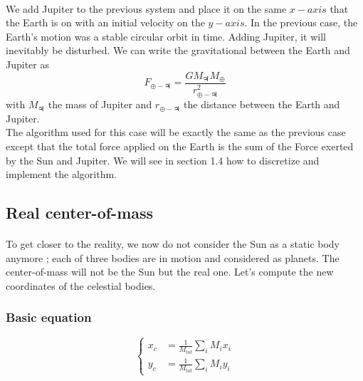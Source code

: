 \documentclass[a4paper, twoside, 11pt]{report}
\theoremstyle{theorem}
\theoremstyle{remark}
\theoremstyle{exemple}
\begin{document}
            \paragraph{}We add Jupiter to the previous system and place it on the same $x-axis$ that the Earth is on  with an initial velocity on the $y-axis$. In the previous case, the Earth's motion was a stable circular orbit in time. Adding Jupiter, it will inevitably be disturbed. We can write the gravitational between the Earth and Jupiter as 
                \begin{equation*}
                    F_{\oplus-\jupiter} = \frac{GM_{\jupiter}M_{\oplus}}{r_{\oplus-\jupiter}^2} 
                \end{equation*}
            with $M_{\jupiter}$ the mass of Jupiter and $r_{\oplus - \jupiter}$ the distance between the Earth and Jupiter. \\
            The algorithm used for this case will be exactly the same as the previous case except that the total force applied on the Earth is the sum of the Force exerted by the Sun and Jupiter. We will see in section 1.4 how to discretize and implement the algorithm. 
            
        \subsection{Real center-of-mass}
        
            \paragraph{}To get closer to the reality, we now do not consider the Sun as a static body anymore ; each of three bodies are in motion and considered as planets. The center-of-mass will not be the Sun but the real one. Let's compute the new coordinates of the celestial bodies.
            
            \subsubsection{Basic equation}
            
                \begin{equation}
                    \left\{
                        \begin{aligned}
                    x_c &= \frac{1}{M_{tot}}\sum\limits_{i} M_i x_i\\
                    y_c &= \frac{1}{M_{tot}}\sum\limits_{i} M_i y_i
                \end{aligned}
                    \right.
                \tag{6}
                \end{equation} 
            
\end{document}
